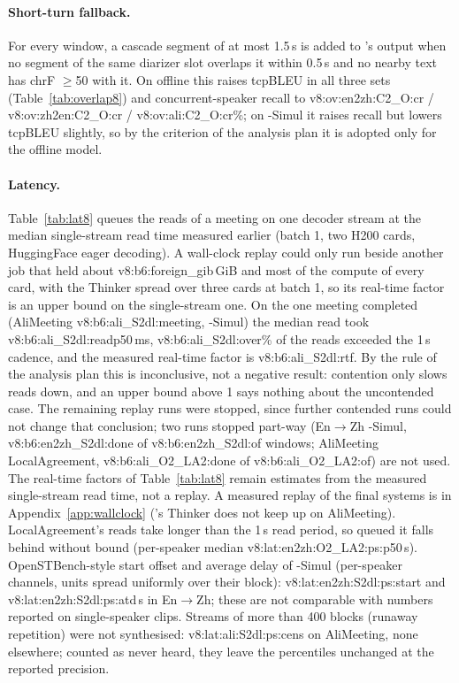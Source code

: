 \paragraph{Short-turn fallback.} For every window, a cascade segment of at most 1.5\,s is added to \sys{}'s output
when no \sys{} segment of the same diarizer slot overlaps it within 0.5\,s and no nearby \sys{} text has chrF $\ge$50 with
it. On offline \sys{} this raises tcpBLEU in all three sets (Table~\ref{tab:overlap8}) and concurrent-speaker recall to
\num{v8:ov:en2zh:C2_O:cr} / \num{v8:ov:zh2en:C2_O:cr} / \num{v8:ov:ali:C2_O:cr}\%; on \sys{}-Simul it raises recall but
lowers tcpBLEU slightly, so by the criterion of the analysis plan it is adopted only for the offline model.

\paragraph{Latency.} Table~\ref{tab:lat8} queues the reads of a meeting on one decoder stream at the median single-stream
read time measured earlier (batch 1, two H200 cards, HuggingFace eager decoding). A wall-clock replay could only run beside another
job that held about \num{v8:b6:foreign_gib}\,GiB and most of the compute of every card,
with the Thinker spread over three cards at batch 1, so its real-time factor is an upper bound on the single-stream one.
On the one meeting completed (AliMeeting \num{v8:b6:ali_S2dl:meeting}, \sys{}-Simul) the median read took
\num{v8:b6:ali_S2dl:readp50}\,ms, \num{v8:b6:ali_S2dl:over}\% of the reads exceeded the 1\,s cadence, and the measured
real-time factor is \num{v8:b6:ali_S2dl:rtf}. By the rule of the analysis plan this is inconclusive, not a negative result:
contention only slows reads down, and an upper bound above 1 says nothing about the uncontended case. The remaining
replay runs were stopped, since further contended runs could not change that conclusion; two runs stopped part-way
(En$\rightarrow$Zh \sys{}-Simul, \num{v8:b6:en2zh_S2dl:done} of \num{v8:b6:en2zh_S2dl:of} windows; AliMeeting LocalAgreement,
\num{v8:b6:ali_O2_LA2:done} of \num{v8:b6:ali_O2_LA2:of}) are not used. The real-time factors of Table~\ref{tab:lat8} remain
estimates from the measured single-stream read time, not a replay.\ifWallclock{} A measured replay of the final systems is in Appendix~\ref{app:wallclock} (\sys{}'s Thinker does not keep up on AliMeeting).\fi{} LocalAgreement's reads take longer than the 1\,s read period, so queued it falls
behind without bound (per-speaker median \num{v8:lat:en2zh:O2_LA2:ps:p50}\,s). OpenSTBench-style start offset and
average delay of \sys{}-Simul (per-speaker channels, units spread uniformly over their block): \num{v8:lat:en2zh:S2dl:ps:start} and
\num{v8:lat:en2zh:S2dl:ps:atd}\,s in En$\rightarrow$Zh; these are not comparable with numbers reported on single-speaker
clips. Streams of more than 400 blocks (runaway repetition) were not synthesised: \num{v8:lat:ali:S2dl:ps:cens} on
AliMeeting, none elsewhere; counted as never heard, they leave the percentiles unchanged at the reported precision.

